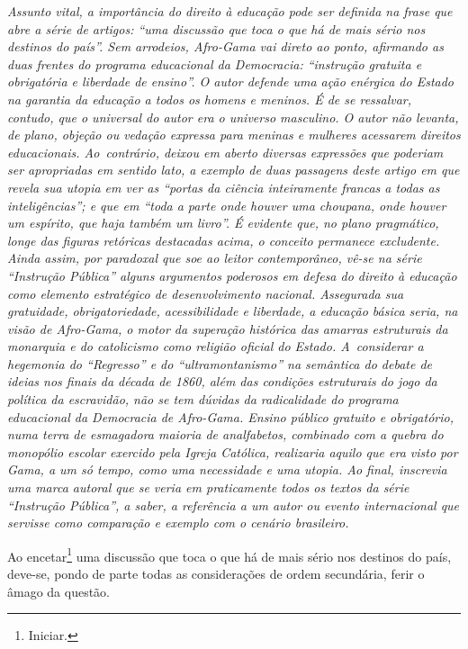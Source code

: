 \begin{didascalia}\itshape
Assunto vital, a importância do direito à educação pode ser definida na
frase que abre a série de artigos: ``uma discussão que toca o que há de
mais sério nos destinos do país''. Sem arrodeios, Afro-Gama vai
direto ao ponto, afirmando as duas frentes do programa educacional da
\textnormal{Democracia}: ``instrução gratuita e obrigatória e liberdade de
ensino''. O autor defende uma ação enérgica do Estado na garantia da
educação a todos os homens e meninos. É de se ressalvar, contudo, que o
universal do autor era o universo masculino. O autor não levanta, de
plano, objeção ou vedação expressa para meninas e mulheres acessarem
direitos educacionais. Ao~contrário, deixou em aberto diversas
expressões que poderiam ser apropriadas em sentido lato, a exemplo de
duas passagens deste artigo em que revela sua utopia em ver as ``portas
da ciência inteiramente francas a todas as inteligências''; e que em
``toda a parte onde houver uma choupana, onde houver um espírito, que
haja também um livro''. É evidente que, no plano pragmático, longe das
figuras retóricas destacadas acima, o conceito permanece excludente.
Ainda assim, por paradoxal que soe ao leitor contemporâneo, vê-se na
série ``Instrução Pública'' alguns argumentos poderosos em defesa
do direito à educação como elemento estratégico de desenvolvimento
nacional. Assegurada sua gratuidade, obrigatoriedade, acessibilidade e
liberdade, a educação básica seria, na visão de Afro-Gama, o
motor da superação histórica das amarras estruturais da monarquia e do
catolicismo como religião oficial do Estado. A~considerar a hegemonia
do ``Regresso'' e do ``ultramontanismo'' na semântica do
debate de ideias nos finais da década de 1860, além das condições
estruturais do jogo da política da escravidão, não se tem dúvidas da
radicalidade do programa educacional da \textnormal{Democracia} de
Afro-Gama. Ensino público gratuito e obrigatório, numa terra de
esmagadora maioria de analfabetos, combinado com a quebra do monopólio
escolar exercido pela Igreja Católica, realizaria aquilo que era visto
por Gama, a um só tempo, como uma necessidade e uma utopia.
Ao final, inscrevia uma marca autoral que se veria em
praticamente todos os textos da série ``Instrução Pública'', a
saber, a referência a um autor ou evento internacional que servisse como
comparação e exemplo com o cenário brasileiro.
\end{didascalia}



Ao encetar\footnote{Iniciar.} uma discussão que toca o que há de mais
sério nos destinos do país, deve-se, pondo de parte todas as
considerações de ordem secundária, ferir o âmago da questão.

